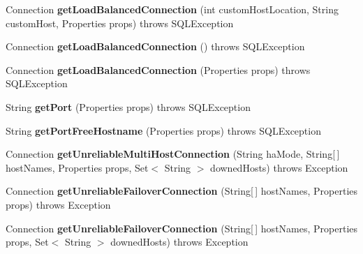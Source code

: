 \begin{DoxyCompactItemize}
Connection {\bfseries get\+Load\+Balanced\+Connection} (int custom\+Host\+Location, String custom\+Host, Properties props)  throws S\+Q\+L\+Exception 
\item 
\mbox{\label{classtestsuite_1_1_base_test_case_aab97786f4a33c78651b4bae1898c9839}} 
Connection {\bfseries get\+Load\+Balanced\+Connection} ()  throws S\+Q\+L\+Exception 
\item 
\mbox{\label{classtestsuite_1_1_base_test_case_add047612e662b6cc0f4798f7a196050b}} 
Connection {\bfseries get\+Load\+Balanced\+Connection} (Properties props)  throws S\+Q\+L\+Exception 
\item 
\mbox{\label{classtestsuite_1_1_base_test_case_ac94c63cb4d1c0bd766ddc811ff3aa5ca}} 
String {\bfseries get\+Port} (Properties props)  throws S\+Q\+L\+Exception 
\item 
\mbox{\label{classtestsuite_1_1_base_test_case_ac54f35a44d1d5e6dc4d41cf6b06cea83}} 
String {\bfseries get\+Port\+Free\+Hostname} (Properties props)  throws S\+Q\+L\+Exception 
\item 
\mbox{\label{classtestsuite_1_1_base_test_case_af5d756474dc2a76bef281fc884529658}} 
Connection {\bfseries get\+Unreliable\+Multi\+Host\+Connection} (String ha\+Mode, String\mbox{[}$\,$\mbox{]} host\+Names, Properties props, Set$<$ String $>$ downed\+Hosts)  throws Exception 
\item 
\mbox{\label{classtestsuite_1_1_base_test_case_af564d6c77d426f7c2fbd614c4e8843f5}} 
Connection {\bfseries get\+Unreliable\+Failover\+Connection} (String\mbox{[}$\,$\mbox{]} host\+Names, Properties props)  throws Exception 
\item 
\mbox{\label{classtestsuite_1_1_base_test_case_ae47036b912887e1198a33eeaf0dff29c}} 
Connection {\bfseries get\+Unreliable\+Failover\+Connection} (String\mbox{[}$\,$\mbox{]} host\+Names, Properties props, Set$<$ String $>$ downed\+Hosts)  throws Exception 
\item 
\mbox{\label{classtestsuite_1_1_base_test_case_a81c482cdb87cc311d0ed83ff480594bf}} 

\end{DoxyCompactItemize}
